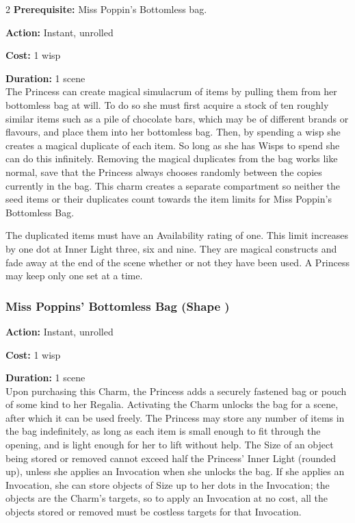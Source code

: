 \begin{multicols}{2}
\noindent \textbf{Prerequisite:} Miss Poppin's Bottomless bag. 

\noindent \textbf{Action:} Instant, unrolled

\noindent \textbf{Cost:} 1 wisp

\noindent \textbf{Duration:} 1 scene \\

\noindent The Princess can create magical simulacrum of items by pulling them from her bottomless bag at will. To do so she must first acquire a stock of ten roughly similar items such as a pile of chocolate bars, which may be of different brands or flavours, and place them into her bottomless bag. Then, by spending a wisp she creates a magical duplicate of each item. So long as she has Wisps to spend she can do this infinitely. Removing the magical duplicates from the bag works like normal, save that the Princess always chooses randomly between the copies currently in the bag. This charm creates a separate compartment so neither the seed items or their duplicates count towards the item limits for Miss Poppin's Bottomless Bag. 

The duplicated items must have an Availability rating of one. This limit increases by one dot at Inner Light three, six and nine. They are magical constructs and fade away at the end of the scene whether or not they have been used. A Princess may keep only one set at a time. 

\subsubsection*{Miss Poppins' Bottomless Bag (Shape \textbullet\textbullet)}

\noindent \textbf{Action:} Instant, unrolled

\noindent \textbf{Cost:} 1 wisp

\noindent \textbf{Duration:} 1 scene \\

\noindent Upon purchasing this Charm, the Princess adds a securely fastened bag or pouch of some kind to her Regalia. Activating the Charm unlocks the bag for a scene, after which it can be used freely. The Princess may store any number of items in the bag indefinitely, as long as each item is small enough to fit through the opening, and is light enough for her to lift without help. The Size of an object being stored or removed cannot exceed half the Princess' Inner Light (rounded up), unless she applies an Invocation when she unlocks the bag. If she applies an Invocation, she can store objects of Size up to her dots in the Invocation; the objects are the Charm's targets, so to apply an Invocation at no cost, all the objects stored or removed must be costless targets for that Invocation.


\end{multicols}
